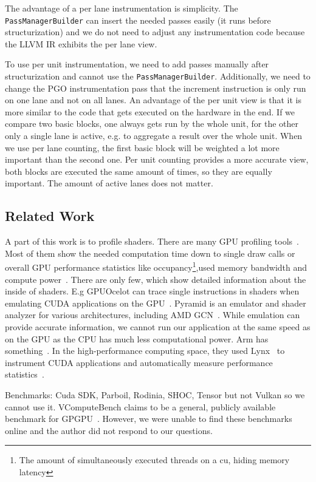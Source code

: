 The advantage of a per lane instrumentation is simplicity. The \texttt{PassManagerBuilder} can insert the needed passes easily (it runs before structurization) and we do not need to adjust any instrumentation code because the LLVM IR exhibits the per lane view.

To use per unit instrumentation, we need to add passes manually after structurization and cannot use the \texttt{PassManagerBuilder}.
Additionally, we need to change the PGO instrumentation pass that the increment instruction is only run on one lane and not on all lanes.
An advantage of the per unit view is that it is more similar to the code that gets executed on the hardware in the end.
If we compare two basic blocks, one always gets run by the whole unit, for the other only a single lane is active, e.g. to aggregate a result over the whole unit.
When we use per lane counting, the first basic block will be weighted a lot more important than the second one.
Per unit counting provides a more accurate view, both blocks are executed the same amount of times, so they are equally important. The amount of active lanes does not matter.

\subsection{Related Work}
\label{sub:relatedwork}
A part of this work is to profile shaders. There are many GPU profiling tools~\cite{UnityGPUProfiler, UnrealGPUProfiling, MSGPUUsage, PGI2014}.
Most of them show the needed computation time down to single draw calls or overall GPU performance statistics like occupancy\footnote{The amount of simultaneously executed threads on a \gls{cu}, hiding memory latency},used memory bandwidth and compute power~\cite{NvidiaNsight, NvidiaShaderPerf, AMDShaderAnalyzer}.
There are only few, which show detailed information about the inside of shaders. E.g GPUOcelot can trace single instructions in shaders when emulating CUDA applications on the GPU~\cite{GPUOcelot, Lakshminarayana2010}. Pyramid is an emulator and shader analyzer for various architectures, including AMD GCN~\cite{Pyramid}.
While emulation can provide accurate information, we cannot run our application at the same speed as on the GPU as the CPU has much less computational power.
Arm has something~\cite{Barton2013}.
In the high-performance computing space, they used Lynx~\cite{Lynx} to instrument CUDA applications and automatically measure performance statistics~\cite{Farooqui2014}.

Benchmarks: Cuda SDK, Parboil, Rodinia, SHOC, Tensor but not Vulkan so we cannot use it. VComputeBench claims to be a general, publicly available benchmark for GPGPU~\cite{Mammeri2018}. However, we were unable to find these benchmarks online and the author did not respond to our questions.

